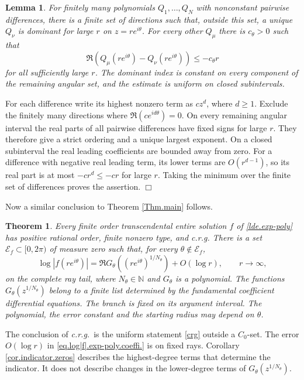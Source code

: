 \documentclass[a4paper,12pt]{article}
\newcommand{\N}{\mathbb{N}}
\newtheorem{theorem}[defin]{Theorem}
\newtheorem{lemma}[defin]{Lemma}
\newenvironment{proof}
{\noindent{\it Proof.}}{\hfill $\Box$\par\vspace{2.5mm}}
\newenvironment{remark}
{\par\vspace{2.5mm}\noindent{\bf Remark.}}{\par\vspace{2.5mm}}
\numberwithin{equation}{section}
\begin{document}
\begin{lemma}\label{lem.full.dominance}
For finitely many polynomials $Q_1,\ldots,Q_N$ with nonconstant pairwise
differences, there is a finite set of directions such that, outside this
set, a unique $Q_\nu$ is dominant for large $r$ on $z=re^{i\theta}$.
For every other $Q_\mu$ there is $c_\theta>0$ such that
\begin{equation}\label{eq.full.dominance}
 \Re(Q_\mu(re^{i\theta})-Q_\nu(re^{i\theta}))\le-c_\theta r
\end{equation}
for all sufficiently large $r$.
The dominant index is constant on every component of the remaining
angular set, and the estimate is uniform on closed subintervals.
\end{lemma}
\begin{proof}
For each difference write its highest nonzero term as $c z^d$, where
$d\ge1$. Exclude the finitely many directions where
$\Re(c e^{id\theta})=0$. On every remaining angular interval the real
parts of all pairwise differences have fixed signs for large $r$.
They therefore give a strict ordering and a unique largest exponent.
On a closed subinterval the real leading coefficients are bounded away
from zero. For a difference with negative real leading term,
its lower terms are $O(r^{d-1})$, so its real part is at most
$-c r^d\le-c r$ for large $r$. Taking the minimum over the finite
set of differences proves the assertion.
\end{proof}

Now a similar conclusion to Theorem \ref{Thm.main} follows.

\begin{theorem}\label{Thm.main.exp-poly}
Every finite order transcendental entire solution $f$ of \eqref{lde.exp-poly}
has positive rational order, finite nonzero type, and \textit{c.r.g}.
There is a set $\mathcal E_f\subset[0,2\pi)$ of measure zero such that,
for every $\theta\notin\mathcal E_f$,
\begin{equation}\label{eq.log|f|.exp-poly.coeffi.}
 \log|f(re^{i\theta})|
 =\Re G_\theta((re^{i\theta})^{1/N_\theta})+O(\log r),
 \qquad r\to\infty,
\end{equation}
on the complete ray tail, where $N_\theta\in\N$ and $G_\theta$ is a polynomial.
The functions $G_\theta(z^{1/N_\theta})$ belong to a finite list determined
by the fundamental coefficient differential equations. The branch is fixed on its argument interval.
The polynomial, the error constant and the starting radius may depend on $\theta$.
\end{theorem}
\begin{remark}
The conclusion of \textit{c.r.g.}\ is the uniform statement
\eqref{crg} outside a $C_0$-set. The error $O(\log r)$ in
\eqref{eq.log|f|.exp-poly.coeffi.} is on fixed rays.
Corollary \ref{cor.indicator.zeros} describes the highest-degree terms
that determine the indicator. It does not describe changes in the
lower-degree terms of $G_\theta(z^{1/N_\theta})$.
\end{remark}
\end{document}
